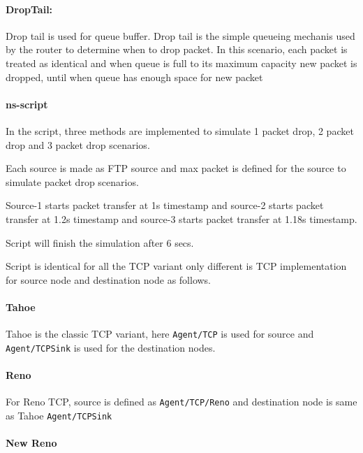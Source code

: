 \documentclass[11pt]{article}
\begin{document}
\paragraph{DropTail:}\label{droptail}

Drop tail is used for queue buffer. Drop tail is the simple queueing
mechanis used by the router to determine when to drop packet. In this
scenario, each packet is treated as identical and when queue is full to
its maximum capacity new packet is dropped, until when queue has enough
space for new packet

\paragraph{ns-script}\label{ns-script}

In the script, three methods are implemented to simulate 1 packet drop,
2 packet drop and 3 packet drop scenarios.

Each source is made as FTP source and max packet is defined for the
source to simulate packet drop scenarios.

Source-1 starts packet transfer at 1s timestamp and source-2 starts
packet transfer at 1.2s timestamp and source-3 starts packet transfer at
1.18s timestamp.

Script will finish the simulation after 6 secs.

Script is identical for all the TCP variant only different is TCP
implementation for source node and destination node as follows.

\paragraph{Tahoe}\label{tahoe}

Tahoe is the classic TCP variant, here \texttt{Agent/TCP} is used for
source and \texttt{Agent/TCPSink} is used for the destination nodes.

\paragraph{Reno}\label{reno}

For Reno TCP, source is defined as \texttt{Agent/TCP/Reno} and
destination node is same as Tahoe \texttt{Agent/TCPSink}

\paragraph{New Reno}\label{new-reno}
\end{document}
